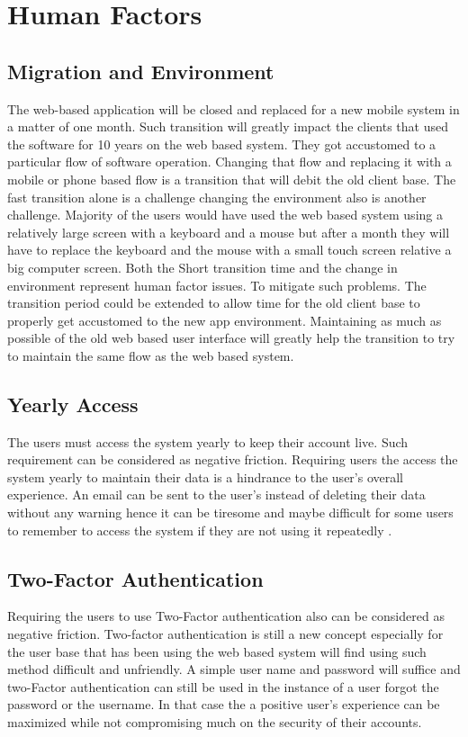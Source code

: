 \documentclass{article}
\begin{document}
	\newpage
\section{Human Factors}
\subsection{Migration and Environment }
The web-based application will be closed and replaced for a new mobile system in a matter of one month. Such transition will greatly impact the clients that used the software for 10 years on the web based system. They got accustomed to a particular flow of software operation. Changing that flow and replacing it with a mobile or phone based flow is a transition that will debit the old client base. The fast transition alone is a challenge changing the environment also is another challenge. Majority of the users would have used the web based system using a relatively large screen with a keyboard and a mouse but after a month they will have to replace the keyboard and the mouse with a small touch screen relative a big computer screen. Both the Short transition time and the change in environment represent human factor issues. To mitigate such problems. The transition period could be extended to allow time for the old client base to properly get accustomed to the new app environment. Maintaining as much as possible of the old web based user interface will greatly help the transition to try to maintain the same flow as the web based system. 


\subsection{Yearly Access}
The users must access the system yearly to keep their account live. Such requirement can be considered as  negative friction. Requiring users the access the system yearly to maintain their data is a hindrance to the user's overall experience. An email can be sent to the user's instead of deleting their data without any warning hence it can be tiresome and maybe difficult for some users to remember to access the system if they are not using it repeatedly . 



\subsection{Two-Factor Authentication}
Requiring the users to use Two-Factor authentication also can be considered as negative friction. Two-factor authentication is still a new concept especially for the user base that has been using the web based system will find using such method difficult and unfriendly. A simple user name and password will suffice and two-Factor authentication can still be used in the instance of a user forgot the password or the username. In that case the a positive user's experience can be maximized while not compromising much on the security of their accounts. 
\end{document}
